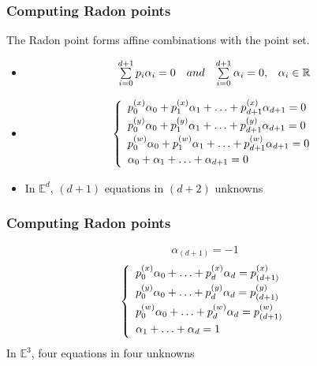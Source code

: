 \documentclass{beamer}
\begin{document}
\begin{frame}
\frametitle{Computing Radon points}
The Radon point forms affine combinations with the point set.
\begin{itemize}[<+->]
\item 	\begin{equation*}
		\begin{array}{c c c c}
			\sum\limits_{i=0}^{d+1}p_i\alpha_i = 0 & and & \sum\limits_{i=0}^{d+1}\alpha_i = 0, & \alpha_i \in \mathbb{R}
		\end{array}
		\end{equation*}
\item	\begin{equation*}\left\lbrace 
		\begin{array}{l}
			\vspace{2pt}p_0^{(x)}\alpha_0 + p_1^{(x)}\alpha_1 + \ldots + p_{d+1}^{(x)}\alpha_{d+1} = 0\\
			\vspace{2pt}p_0^{(y)}\alpha_0 + p_1^{(y)}\alpha_1 + \ldots + p_{d+1}^{(y)}\alpha_{d+1} = 0\\
			\vspace{2pt}p_0^{(w)}\alpha_0 + p_1^{(w)}\alpha_1 + \ldots + p_{d+1}^{(w)}\alpha_{d+1} = 0\\
			\vspace{2pt}\alpha_0 + \alpha_1 + \ldots + \alpha_{d+1} = 0
		\end{array}\right. 
		\end{equation*}
\item In $\mathbb{E}^d$, $(d+1)$ equations in $(d+2)$ unknowns \XBox
\end{itemize}
\end{frame}

\begin{frame}
\frametitle{Computing Radon points}
\begin{equation*}
\boxed{\alpha_{(d+1)} = -1}
\end{equation*}
\newline
\begin{equation*}\left\lbrace 
\begin{array}{l}
	\vspace{2pt}p_0^{(x)}\alpha_0 + \ldots + p_d^{(x)}\alpha_d = p_{(d+1)}^{(x)}\\
	\vspace{2pt}p_0^{(y)}\alpha_0 + \ldots + p_d^{(y)}\alpha_d = p_{(d+1)}^{(y)}\\
	\vspace{2pt}p_0^{(w)}\alpha_0 + \ldots + p_d^{(w)}\alpha_d = p_{(d+1)}^{(w)}\\
	\vspace{2pt}\alpha_1 + \ldots + \alpha_d = 1
\end{array}\right. 
\end{equation*}
\newline
In $\mathbb{E}^3$, four equations in four unknowns \CheckedBox
\end{frame}
\end{document}
